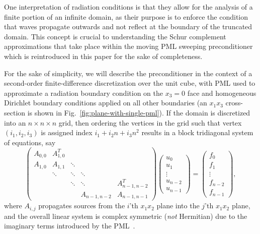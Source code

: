 One interpretation of radiation conditions is that they allow for the 
analysis of a finite portion of an infinite domain, as their purpose is to 
enforce the condition that waves propagate outwards and not reflect at the 
boundary of the truncated domain.
This concept is crucial to understanding the Schur complement approximations 
that take place within the moving PML sweeping preconditioner which is 
reintroduced in this paper for the sake of completeness.

For the sake of simplicity, we will describe the preconditioner in the context
of a second-order finite-difference discretization over the unit cube,
with PML used to approximate a radiation boundary condition on the $x_3=0$ face
and homogeneous Dirichlet boundary conditions applied on all other boundaries
(an $x_1 x_3$ cross-section is shown in Fig.~\ref{fig:plane-with-single-pml}). 
If the domain is discretized into an 
$n \times n \times n$ grid, then ordering the vertices in the grid such that 
vertex $(i_1,i_2,i_3)$ is assigned index 
$i_1 + i_2 n + i_3 n^2$ results in a block tridiagonal system of equations, say
\begin{equation}
  \left(\begin{array}{ccccc} 
          A_{0,0} & A_{1,0}^T &        &           &               \\
          A_{1,0} & A_{1,1}   & \ddots &           &               \\
                  & \ddots    & \ddots & \ddots    &               \\
                  &           & \ddots & \ddots    & A_{n-1,n-2}^T \\
                  &           &        & A_{n-1,n-2} & A_{n-1,n-1}
  \end{array}\right) 
  \left(\begin{array}{c}u_0\\ u_1\\\vdots\\u_{n-2}\\u_{n-1}\end{array}\right)=
  \left(\begin{array}{c}f_0\\ f_1\\\vdots\\f_{n-2}\\f_{n-1}\end{array}\right),
\end{equation}
where $A_{i,j}$ propagates sources from the $i$'th $x_1x_2$ plane into the 
$j$'th $x_1x_2$ plane, and the overall linear system is complex symmetric 
({\em not} Hermitian) due to the imaginary terms introduced by the 
PML~\cite{EngquistYing-PML}. 

